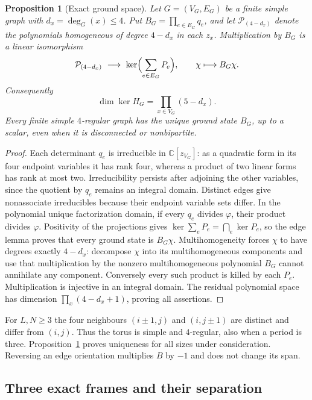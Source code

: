 \documentclass[11pt,reqno]{amsart}
\newtheorem{proposition}[theorem]{Proposition}
\theoremstyle{definition}
\newcommand{\C}{\mathbb C}
\begin{document}
\begin{proposition}[Exact ground space]\label{p:graphkernel}
Let $G=(V_G,E_G)$ be a finite simple graph with $d_x=\deg_G(x)\le4$.
Put $B_G=\prod_{e\in E_G}q_e$, and let $\mathcal P_{(4-d_x)}$ denote
the polynomials homogeneous of degree $4-d_x$ in each $z_x$.
Multiplication by $B_G$ is a linear isomorphism
\begin{equation}\label{e:graphkernel}
 \mathcal P_{(4-d_x)}\ \longrightarrow\ \ker\Bigl(\sum_{e\in E_G}P_e\Bigr),
 \qquad \chi\longmapsto B_G\chi.
\end{equation}
Consequently
\[
 \dim\ker H_G=\prod_{x\in V_G}(5-d_x).
\]
Every finite simple $4$-regular graph has the unique ground state $B_G$,
up to a scalar, even when it is disconnected or nonbipartite.
\end{proposition}
\begin{proof}
Each determinant $q_e$ is irreducible in $\C[z_{V_G}]$: as a quadratic
form in its four endpoint variables it has rank four, whereas a product
of two linear forms has rank at most two. Irreducibility persists after
adjoining the other variables, since the quotient by $q_e$ remains an
integral domain. Distinct edges give nonassociate irreducibles because
their endpoint variable sets differ. In the polynomial unique
factorization domain, if every $q_e$ divides $\varphi$, their product
divides $\varphi$. Positivity of the projections gives
$\ker\sum_eP_e=\bigcap_e\ker P_e$, so the edge lemma proves that every
ground state is $B_G\chi$. Multihomogeneity forces $\chi$ to have degrees
exactly $4-d_x$: decompose $\chi$ into its multihomogeneous components
and use that multiplication by the nonzero multihomogeneous polynomial
$B_G$ cannot annihilate any component. Conversely every such product
is killed by each $P_e$. Multiplication is injective in an integral
domain. The residual polynomial space has dimension
$\prod_x(4-d_x+1)$, proving all assertions.
\end{proof}

For $L,N\ge3$ the four neighbours $(i\pm1,j)$ and $(i,j\pm1)$ are
distinct and differ from $(i,j)$. Thus the torus is simple and
$4$-regular, also when a period is three. Proposition~\ref{p:graphkernel}
proves uniqueness for all sizes under consideration. Reversing an edge
orientation multiplies $B$ by $-1$ and does not change its span.

\subsection{Three exact frames and their separation}
\end{document}
